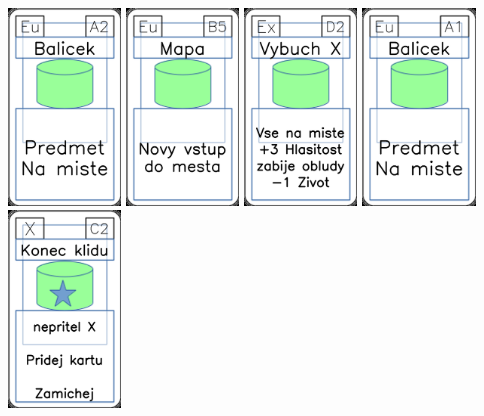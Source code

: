 \documentclass[a4paper]{article}
\begin{document}
	\includegraphics[width=3.0cm]{img-4_31}
	\includegraphics[width=3.0cm]{img-4_39}
	\includegraphics[width=3.0cm]{img-4_16}
	\includegraphics[width=3.0cm]{img-4_30}
	\includegraphics[width=3.0cm]{img-5_11}
\end{document}
